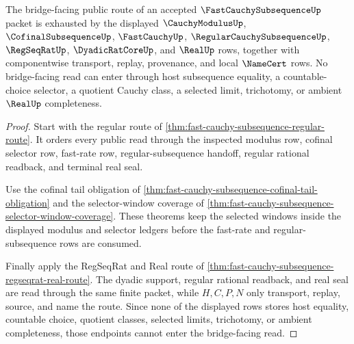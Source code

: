 \begin{theorem}
\label{thm:fast-cauchy-subsequence-bridge-scope}
The bridge-facing public route of an accepted $\FastCauchySubsequenceUp$ packet is exhausted by the displayed $\CauchyModulusUp$, $\CofinalSubsequenceUp$, $\FastCauchyUp$, $\RegularCauchySubsequenceUp$, $\RegSeqRatUp$, $\DyadicRatCoreUp$, and $\RealUp$ rows, together with componentwise transport, replay, provenance, and local $\NameCert$ rows. No bridge-facing read can enter through host subsequence equality, a countable-choice selector, a quotient Cauchy class, a selected limit, trichotomy, or ambient $\RealUp$ completeness.
\end{theorem}
\begin{proof}
Start with the regular route of \autoref{thm:fast-cauchy-subsequence-regular-route}. It orders every public read through the inspected modulus row, cofinal selector row, fast-rate row, regular-subsequence handoff, regular rational readback, and terminal real seal.

Use the cofinal tail obligation of \autoref{thm:fast-cauchy-subsequence-cofinal-tail-obligation} and the selector-window coverage of \autoref{thm:fast-cauchy-subsequence-selector-window-coverage}. These theorems keep the selected windows inside the displayed modulus and selector ledgers before the fast-rate and regular-subsequence rows are consumed.

Finally apply the RegSeqRat and Real route of \autoref{thm:fast-cauchy-subsequence-regseqrat-real-route}. The dyadic support, regular rational readback, and real seal are read through the same finite packet, while $H,C,P,N$ only transport, replay, source, and name the route. Since none of the displayed rows stores host equality, countable choice, quotient classes, selected limits, trichotomy, or ambient completeness, those endpoints cannot enter the bridge-facing read.
\end{proof}

